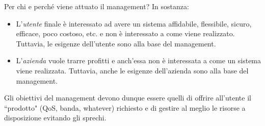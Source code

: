 \noindent Per chi e perché viene attuato il management? In sostanza:
\begin{itemize}
	\item L'\textit{utente} finale è interessato ad avere un sistema affidabile, flessibile, sicuro, efficace, poco costoso, etc. e non è interessato a come viene realizzato. Tuttavia, le esigenze dell'utente sono alla base del management.
	\item L'\textit{azienda} vuole trarre profitti e anch'essa non è interessata a come un sistema viene realizzata. Tuttavia, anche le esigenze dell'azienda sono alla base del management.
\end{itemize}
Gli obiettivi del management devono dunque essere quelli di offrire all'utente il \textquotedblleft prodotto" (QoS, banda, whatever) richiesto e di gestire al meglio le risorse a disposizione evitando gli sprechi.

